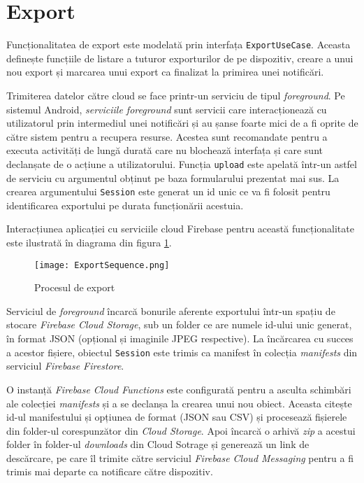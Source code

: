 \section{Export}

Funcționalitatea de export este modelată prin interfața \texttt{ExportUseCase}. Aceasta definește funcțiile de listare a tuturor exporturilor de pe dispozitiv, creare a unui nou export și marcarea unui export ca finalizat la primirea unei notificări.



Trimiterea datelor către cloud se face printr-un serviciu de tipul \emph{foreground}. Pe sistemul Android, \emph{serviciile foreground} sunt servicii care interacționează cu utilizatorul prin intermediul unei notificări și au șanse foarte mici de a fi oprite de către sistem pentru a recupera resurse. Acestea sunt recomandate pentru a executa activități de lungă durată care nu blochează interfața și care sunt declanșate de o acțiune a utilizatorului. Funcția \texttt{upload} este apelată într-un astfel de serviciu cu argumentul obținut pe baza formularului prezentat mai sus. La crearea argumentului \texttt{Session} este generat un id unic ce va fi folosit pentru identificarea exportului pe durata funcționării acestuia.

Interacțiunea aplicației cu serviciile cloud Firebase pentru această funcționalitate este ilustrată în diagrama din figura \ref{exportProcess}.

\begin{figure}[ht]
  \centering
  \texttt{[image: ExportSequence.png]}
  \caption{Procesul de export}
  \label{exportProcess}
\end{figure}

Serviciul de \emph{foreground} încarcă bonurile aferente exportului într-un spațiu de stocare \emph{Firebase Cloud Storage}, sub un folder ce are numele id-ului unic generat, în format JSON (opțional și imaginile JPEG respective). La încărcarea cu succes a acestor fișiere, obiectul \texttt{Session} este trimis ca manifest în colecția \emph{manifests} din serviciul \emph{Firebase Firestore}.

O instanță \emph{Firebase Cloud Functions} este configurată pentru a asculta schimbări ale colecției \emph{manifests} și a se declanșa la crearea unui nou obiect. Aceasta citește id-ul manifestului și opțiunea de format (JSON sau CSV) și procesează fișierele din folder-ul corespunzător din \emph{Cloud Storage}. Apoi încarcă o arhivă \emph{zip} a acestui folder în folder-ul \emph{downloads} din Cloud Sotrage și generează un link de descărcare, pe care îl trimite către serviciul \emph{Firebase Cloud Messaging} pentru a fi trimis mai departe ca notificare către dispozitiv.

